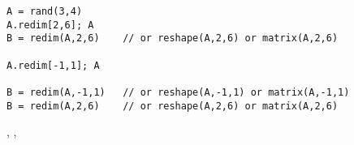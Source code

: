 \begin{examples}
\begin{Verbatim}
A = rand(3,4)
A.redim[2,6]; A
B = redim(A,2,6)    // or reshape(A,2,6) or matrix(A,2,6)

A.redim[-1,1]; A    

B = redim(A,-1,1)   // or reshape(A,-1,1) or matrix(A,-1,1)
B = redim(A,2,6)    // or reshape(A,2,6) or matrix(A,2,6)
\end{Verbatim}
\end{examples}

\begin{manseealso}
   , ,  
\end{manseealso}


